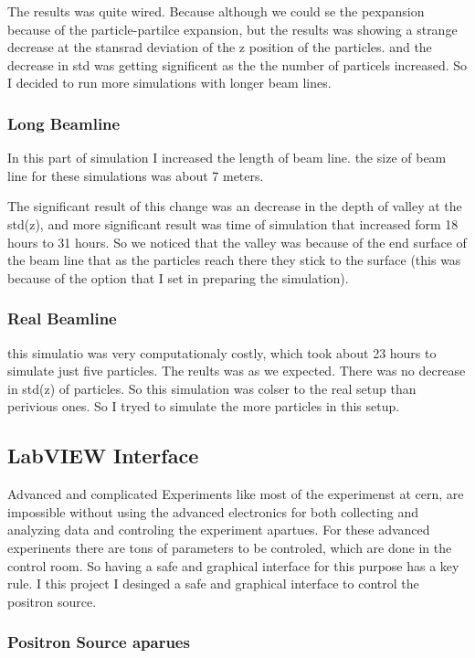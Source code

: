 \documentclass{article}
\begin{document}
The results was quite wired. Because although we could se the pexpansion because of the particle-partilce expansion, but the results was showing a strange decrease at the  stansrad deviation of the z position of the particles. and the decrease in std was getting significent as the the number of particels increased. So I decided to run more simulations with longer beam lines.

\subsubsection{Long Beamline}
In this part of simulation I increased the length of beam line. the size of beam line for these simulations was about 7 meters. 

The significant result of this change was an decrease in the depth of valley at the std(z), and more significant result was time of simulation that increased form 18 hours to 31 hours.
 So we noticed that the valley was because of the end surface of the beam line that as the particles reach there they stick to the surface (this was because of the option that I set in preparing the simulation).
 
\subsubsection{Real Beamline}
this simulatio was very computationaly costly, which took about 23 hours to simulate just five particles. The reults was as we expected. There was no decrease in std(z) of particles. So this simulation was colser to the real setup than perivious ones. So I tryed to simulate the more particles in this setup.



\subsection{LabVIEW Interface}
Advanced and complicated Experiments like most of the experimenst at cern, are impossible without using the advanced electronics for both collecting and analyzing data and controling the experiment apartues. For these advanced experinents there are tons of parameters to be controled, which are done in the control room. 
So having a safe and graphical interface for this purpose has a key rule. I this project I desinged a safe and graphical interface to control the positron source.
\subsubsection{Positron Source aparues}
\end{document}

